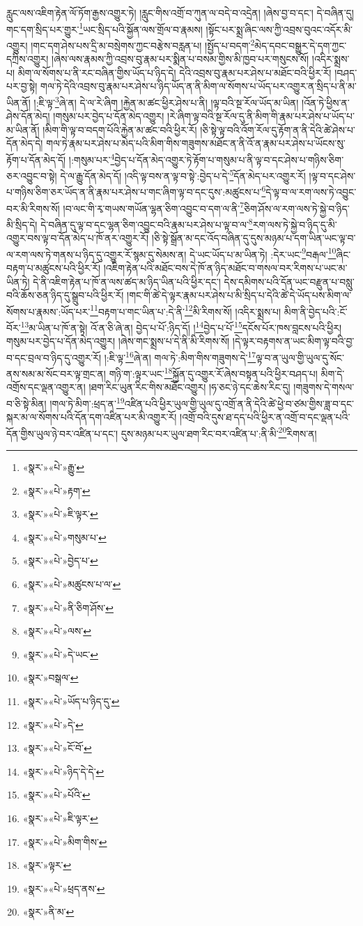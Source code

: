 རླུང་ལས་འཇིག་རྟེན་ལོ་ཏོག་རྒྱས་འགྱུར་ཏེ། །རླུང་གིས་འགྲོ་བ་ཀུན་ལ་བདེ་བ་འདྲེན། །ཞེས་བྱ་བ་དང་། དེ་བཞིན་དུ། གང་དག་སྲིད་པར་གྱུར་\footnote{«སྣར་»«པེ་»རྒྱུ་}ཡང་སྲིད་པའི་སྐྱོན་ལས་གྲོལ་བ་རྣམས། །སྟོང་པར་སྨྲ་ཞིང་ལས་ཀྱི་འབྲས་བུའང་འདོར་མི་འགྱུར། །གང་དག་ཤེས་པས་དྲི་མ་བསྲེགས་ཀྱང་བརྩེས་བརླན་པ། །སྤྱོད་པ་བདག་\footnote{«སྣར་»«པེ་»རྟག་}མེད་དབང་བསྒྱུར་དེ་དག་ཀྱང་དཀྲིས་འགྱུར། །ཞེས་ལས་རྣམས་ཀྱི་འབྲས་བུ་རྣམ་པར་སྨིན་པ་བསམ་གྱིས་མི་ཁྱབ་པར་གསུངས་སོ། །འདིར་སྨྲས་པ། མིག་ལ་སོགས་པ་ནི་རང་བཞིན་གྱིས་ཡོད་པ་ཉིད་དེ། དེའི་འབྲས་བུ་རྣམ་པར་ཤེས་པ་མཐོང་བའི་ཕྱིར་རོ། །བཤད་པར་བྱ་སྟེ། གལ་ཏེ་དེའི་འབྲས་བུ་རྣམ་པར་ཤེས་པ་ཉིད་ཡོད་ན་ནི་མིག་ལ་སོགས་པ་ཡོད་པར་འགྱུར་ན་སྲིད་པ་ནི་མ་ཡིན་ནོ། །:ཇི་ལྟ་\footnote{«སྣར་»«པེ་»ཇི་ལྟར་}ཞེ་ན། དེ་ལ་རེ་ཞིག །རྐྱེན་མ་ཚང་ཕྱིར་ཤེས་པ་ནི། །ལྟ་བའི་སྔ་རོལ་ཡོད་མ་ཡིན། །འོན་ཏེ་ཕྱིས་ན་ཤེས་དོན་མེད། །གསུམ་པར་བྱེད་པ་དོན་མེད་འགྱུར། །རེ་ཞིག་ལྟ་བའི་སྔ་རོལ་དུ་ནི་མིག་གི་རྣམ་པར་ཤེས་པ་ཡོད་པ་མ་ཡིན་ནོ། །མིག་གི་ལྟ་བ་བདག་པོའི་རྐྱེན་མ་ཚང་བའི་ཕྱིར་རོ། །ཅི་སྟེ་ལྟ་བའི་འོག་རོལ་དུ་རྟོག་ན་ནི་དེའི་ཚེ་ཤེས་པ་དོན་མེད་དེ། གལ་ཏེ་རྣམ་པར་ཤེས་པ་མེད་པའི་མིག་གིས་གཟུགས་མཐོང་ན་ནི་འོ་ན་རྣམ་པར་ཤེས་པ་ཡོངས་སུ་རྟོག་པ་དོན་མེད་དོ། །:གསུམ་པར་\footnote{«སྣར་»«པེ་»གསུམ་པ་}བྱེད་པ་དོན་མེད་འགྱུར་ཏེ་རྟོག་པ་གསུམ་པ་ནི་ལྟ་བ་དང་ཤེས་པ་གཉིས་ཅིག་ཅར་འབྱུང་བ་སྟེ། དེ་ལ་རྒྱུ་དོན་མེད་དོ། །འདི་ལྟ་བས་ན་ལྟ་བ་སྟེ་:བྱེད་པ་དེ་\footnote{«སྣར་»«པེ་»བྱེད་པ་}དོན་མེད་པར་འགྱུར་རོ། །ལྟ་བ་དང་ཤེས་པ་གཉིས་ཅིག་ཅར་ཡོད་ན་ནི་རྣམ་པར་ཤེས་པ་གང་ཞིག་ལྟ་བ་དང་དུས་:མཚུངས་པ་\footnote{«སྣར་»«པེ་»མཚུངས་པ་ལ་}དེ་ལྟ་བ་ལ་རག་ལས་ཏེ་འབྱུང་བར་མི་རིགས་སོ། །བ་ལང་གི་རྭ་གཡས་གཡོན་ལྷན་ཅིག་འབྱུང་བ་དག་ལ་ནི་\footnote{«སྣར་»«པེ་»ནི་ཅིག་ཤོས་}ཅིག་ཤོས་ལ་རག་ལས་ཏེ་སྐྱེ་བ་ཉིད་མི་སྲིད་དེ། དེ་བཞིན་དུ་ལྟ་བ་དང་ལྷན་ཅིག་འབྱུང་བའི་རྣམ་པར་ཤེས་པ་ལྟ་བ་ལ་\footnote{«སྣར་»«པེ་»ལས་}རག་ལས་ཏེ་སྐྱེ་བ་ཉིད་དུ་མི་འགྱུར་བས་ལྟ་བ་དོན་མེད་པ་ཁོ་ནར་འགྱུར་རོ། །ཅི་སྟེ་སྒྲོན་མ་དང་འོད་བཞིན་དུ་དུས་མཉམ་པ་དག་ཡིན་ཡང་ལྟ་བ་ལ་རག་ལས་ཏེ་གནས་པ་ཉིད་དུ་འགྱུར་རོ་སྙམ་དུ་སེམས་ན། དེ་ཡང་ཡོད་པ་མ་ཡིན་ཏེ། :དེར་ཡང་\footnote{«སྣར་»«པེ་»དེ་ཡང་}བརྒལ་\footnote{«སྣར་»བསྒལ་}ཞིང་བརྟག་པ་མཚུངས་པའི་ཕྱིར་རོ། །འཇིག་རྟེན་པའི་མཐོང་བས་དེ་ཁོ་ན་ཉིད་མཐོང་བ་གསལ་བར་རིགས་པ་ཡང་མ་ཡིན་ཏེ། དེ་ནི་འཇིག་རྟེན་པ་ཁོ་ན་ལས་ཚད་མ་ཉིད་ཡིན་པའི་ཕྱིར་དང་། དེས་དམིགས་པའི་དོན་ཡང་བརྫུན་པ་བསླུ་བའི་ཆོས་ཅན་ཉིད་དུ་སྒྲུབ་པའི་ཕྱིར་རོ། །གང་གི་ཚེ་དེ་ལྟར་རྣམ་པར་ཤེས་པ་མི་སྲིད་པ་དེའི་ཚེ་དེ་ཡོད་པས་མིག་ལ་སོགས་པ་རྣམས་:ཡོད་པར་\footnote{«སྣར་»«པེ་»ཡོད་པ་ཉིད་དུ་}བརྟག་པ་གང་ཡིན་པ་:དེ་ནི་\footnote{«སྣར་»«པེ་»དེ་}མི་རིགས་སོ། །འདིར་སྨྲས་པ། མིག་ནི་བྱེད་པའི་:ངོ་བོར་\footnote{«སྣར་»«པེ་»ངོ་བོ་}མ་ཡིན་པ་ཁོ་ན་སྟེ། འོ་ན་ཅི་ཞེ་ན། བྱེད་པ་པོ་:ཉིད་དོ། །\footnote{«སྣར་»«པེ་»ཉིད་དེ་དེ་}བྱེད་པ་པོ་\footnote{«སྣར་»«པེ་»པོའི་}དངོས་པོར་ཁས་བླངས་པའི་ཕྱིར། གསུམ་པར་བྱེད་པ་དོན་མེད་འགྱུར། །ཞེས་གང་སྨྲས་པ་དེ་ནི་མི་རིགས་སོ། །དེ་ལྟར་བརྟགས་ན་ཡང་མིག་ལྟ་བའི་བྱ་བ་དང་བྲལ་བ་ཉིད་དུ་འགྱུར་རོ། །:ཇི་ལྟ་\footnote{«སྣར་»«པེ་»ཇི་ལྟར་}ཞེ་ན། གལ་ཏེ་:མིག་གིས་གཟུགས་དེ་\footnote{«སྣར་»«པེ་»མིག་གིས་}ལྟ་བ་ན་ཡུལ་གྱི་ཡུལ་དུ་སོང་ནས་སམ་མ་སོང་བར་ལྟ་གྲང་ན། གཉི་ག་:ལྟར་ཡང་\footnote{«སྣར་»ལྟར་}སྐྱོན་དུ་འགྱུར་རོ་ཞེས་བསྟན་པའི་ཕྱིར་བཤད་པ། མིག་དེ་འགྲོས་དང་ལྡན་འགྱུར་ན། །ཐག་རིང་ཡུན་རིང་གིས་མཐོང་འགྱུར། །ཧ་ཅང་ཉེ་དང་ཆེས་རིང་དུ། །གཟུགས་དེ་གསལ་བ་ཅི་སྟེ་མིན། །གལ་ཏེ་མིག་:ཕྲད་ན་\footnote{«སྣར་»«པེ་»ཕྲད་ནས་}འཛིན་པའི་ཕྱིར་ཡུལ་གྱི་ཡུལ་དུ་འགྲོ་ན་ནི་དེའི་ཚེ་ཕྱེ་བ་ཙམ་གྱིས་ཟླ་བ་དང་སྐར་མ་ལ་སོགས་པའི་དོན་དག་འཛིན་པར་མི་འགྱུར་རོ། །འགྲོ་བའི་དུས་ཐ་དད་པའི་ཕྱིར་ན་འགྲོ་བ་དང་ལྡན་པའི་དོན་གྱིས་ཡུལ་ཉེ་བར་འཛིན་པ་དང་། དུས་མཉམ་པར་ཡུལ་ཐག་རིང་བར་འཛིན་པ་:ནི་མི་\footnote{«སྣར་»ནི་མ་}རིགས་ན། 